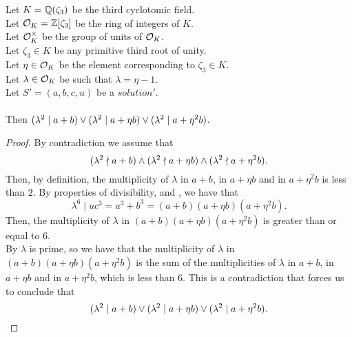 \begin{lemma}
    \label{lmm:lambda_sq_dvd_or_dvd_or_dvd}
    \leanok
    Let $K = \mathbb{Q}(\zeta_3)$ be the third cyclotomic field. \\
    Let $\mathcal{O}_K = \mathbb{Z}[\zeta_3]$ be the ring of integers of $K$. \\
    Let $\mathcal{O}^\times_K$ be the group of units of $\mathcal{O}_K$. \\
    Let $\zeta_3 \in K$ be any primitive third root of unity. \\
    Let $\eta \in \mathcal{O}_K$ be the element corresponding to $\zeta_3 \in K$. \\
    Let $\lambda \in \mathcal{O}_K$ be such that $\lambda = \eta -1$. \\
    Let $S'=(a, b, c, u)$ be a $solution'$.\\\\
    Then $(\lambda^2 \mid a + b) \lor (\lambda^2 \mid a +
    \eta b) \lor (\lambda^2 \mid a + \eta^2 b)$.
\end{lemma}
\begin{proof}
    \leanok
    By contradiction we assume that
    $$(\lambda^2 \nmid a + b) \land (\lambda^2 \nmid a +
    \eta b) \land (\lambda^2 \nmid a + \eta^2 b).$$
    Then, by definition, the multiplicity of $\lambda$ in $a + b$, in $a +
    \eta b$ and in $a + \eta^2 b$ is less than $2$.
    By properties of divisibility,  and ,
    we have that
    $$\lambda^6 ∣ u c^3 = a^3 + b^3 = (a + b) (a + \eta b) (a + \eta^2 b).$$
    Then, the multiplicity of $\lambda$ in $(a + b) (a + \eta b) (a + \eta^2 b)$ is greater than
    or equal to $6$. \\
    By  $\lambda$ is prime, so we have that the multiplicity of $\lambda$
    in $(a + b) (a + \eta b) (a + \eta^2 b)$ is the sum of the multiplicities of $\lambda$ in
    $a + b$, in $a + \eta b$ and in $a + \eta^2 b$, which is less than $6$.
    This is a contradiction that forces us to conclude that
    $$(\lambda^2 \mid a + b) \lor (\lambda^2 \mid a +
    \eta b) \lor (\lambda^2 \mid a + \eta^2 b).$$
\end{proof}

